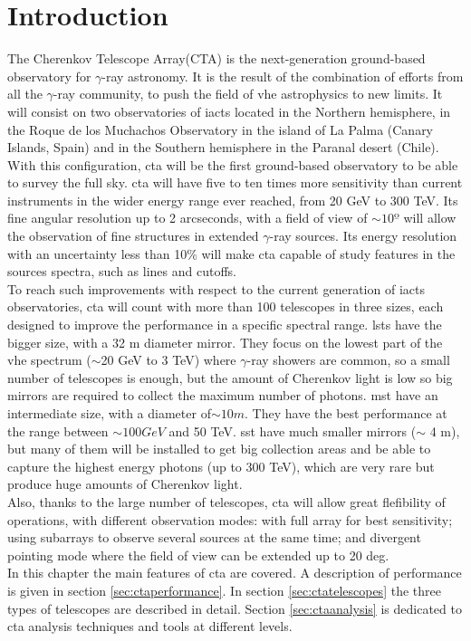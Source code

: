 \documentclass[main.tex]{subfiles}
\begin{document}
\section{Introduction}

The Cherenkov Telescope Array(CTA)\cite{CTA} is the next-generation ground-based observatory for $\gamma$-ray astronomy. It is the result of the combination of efforts from all the $\gamma$-ray community, to push the field of \gls{vhe} astrophysics to new limits. It will consist on two observatories of \glspl{iact} located in the Northern hemisphere, in the Roque de los Muchachos Observatory in the island of La Palma (Canary Islands, Spain) and in the Southern hemisphere in the Paranal desert (Chile). With this configuration, \gls{cta} will be the first ground-based observatory to be able to survey the full sky. \gls{cta} will have five to ten times more sensitivity than current instruments in the wider energy range ever reached, from 20 GeV to 300 TeV. Its fine angular resolution up to 2 arcseconds, with a field of view of $\sim 10º$ will allow the observation of fine structures in extended $\gamma$-ray sources. Its energy resolution with an uncertainty less than 10\% will make \gls{cta} capable of study features in the sources spectra, such as lines and cutoffs.\\
To reach such improvements with respect to the current generation of \glspl{iact} observatories, \gls{cta} will count with more than 100 telescopes in three sizes, each designed to improve the performance in a specific spectral range. \glspl{lst} have the bigger size, with a 32 m diameter mirror. They focus on the lowest part of the \gls{vhe} spectrum ($\sim$20 GeV to 3 TeV) where $\gamma$-ray showers are common, so a small number of telescopes is enough, but the amount of Cherenkov light is low so big mirrors are required to collect the maximum number of photons. \gls{mst} have an intermediate size, with a diameter of$\sim 10m$. They have the best performance at the range between $\sim 100 GeV$ and 50 TeV. \gls{sst} have much smaller mirrors ($\sim$ 4 m), but many of them will be installed to get big collection areas and be able to capture the highest energy photons (up to 300 TeV), which are very rare but produce huge amounts of Cherenkov light.\\
Also, thanks to the large number of telescopes, \gls{cta} will allow great flefibility of operations, with different observation modes: with full array for best sensitivity; using subarrays to observe several sources at the same time; and divergent pointing mode where the field of view can be extended up to 20 deg.\\
In this chapter the main features of \gls{cta} are covered. A description of performance is given in section \ref{sec:ctaperformance}. In section \ref{sec:ctatelescopes} the three types of telescopes are described in detail. Section \ref{sec:ctaanalysis} is dedicated to \gls{cta} analysis techniques and tools at different levels.
\end{document}
